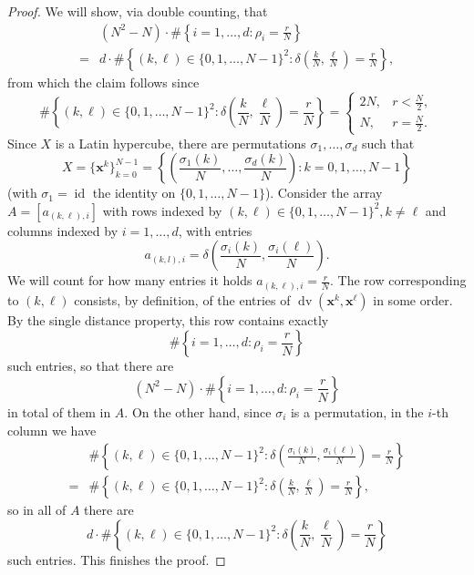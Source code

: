 \documentclass[10pt,a4paper]{amsart}
\newcommand{\bx}{\mathbf{x}}
\newcommand{\dv}{\operatorname{dv}}
\newcommand{\id}{\operatorname{id}}
\begin{document}
\begin{proof}
    We will show, via double counting, that
    \begin{align*}
        & (N^2-N) \cdot \#\left\{i=1, \dots, d: \rho_i = \frac rN\right\} \\
        = & d \cdot \#\left\{(k, \ell) \in \{0, 1, \dots, N-1\}^2: \delta\left(\frac kN, \frac \ell N\right) = \frac rN\right\},
    \end{align*}
    from which the claim follows since
    $$
    \#\left\{(k, \ell) \in \{0, 1, \dots, N-1\}^2: \delta\left(\frac kN, \frac \ell N\right) = \frac rN\right\} = \begin{cases}
        2N, &  r < \frac N2, \\
        N ,&  r = \frac N2.
    \end{cases}
    $$
    Since $X$ is a Latin hypercube, there are permutations $\sigma_1, \dots, \sigma_d$ %
    such that %
    $$
    X = \{\bx^k\}_{k=0}^{N-1} = \left\{\left(\frac{\sigma_1(k)}N, \dots, \frac{\sigma_d(k)}N\right): k=0, 1, \dots, N-1\right\}
    $$
    (with $\sigma_1 = \id$ the identity on $\{0, 1, \dots, N-1\}$). Consider the array $A = [a_{(k, \ell), i}]$ with rows indexed by $(k, \ell) \in \{0, 1, \dots, N-1\}^2, k \neq \ell$ and columns indexed by $i=1, \dots, d$, with entries
    $$
    a_{(k, l), i} = \delta\left(\frac{\sigma_i(k)}N, \frac{\sigma_i(\ell)}N\right).
    $$
    We will count for how many entries it holds $a_{(k, \ell), i} = \frac rN$. The row corresponding to $(k, \ell)$ consists, by definition, of the entries of $\dv(\bx^k, \bx^\ell)$ in some order. By the single distance property, this row contains exactly
    $$
    \#\left\{i=1, \dots, d: \rho_i = \frac rN\right\}
    $$
    such entries, so that there are
    $$
    (N^2-N) \cdot \#\left\{i=1, \dots, d: \rho_i = \frac rN\right\}
    $$
    in total of them in $A$. On the other hand, since $\sigma_i$ is a permutation, in the $i$-th column we have
    \begin{align*}
        & \#\left\{(k, \ell) \in \{0, 1, \dots, N-1\}^2: \delta\left(\frac {\sigma_i(k)}N, \frac {\sigma_i(\ell)}N\right) = \frac rN\right\} \\
        = & \#\left\{(k, \ell) \in \{0, 1, \dots, N-1\}^2: \delta\left(\frac {k}N, \frac {\ell}N\right) = \frac rN\right\},
    \end{align*}
    so in all of $A$ there are
    $$
    d \cdot \#\left\{(k, \ell) \in \{0, 1, \dots, N-1\}^2: \delta\left(\frac {k}N, \frac {\ell}N\right) = \frac rN\right\}
    $$
    such entries. This finishes the proof.
\end{proof}
\end{document}
